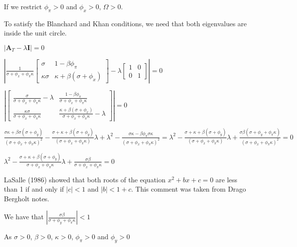\documentclass[
]{article}
\begin{document}
If we restrict \(\phi_\pi>0\) and \(\phi_x>0\), \(\Omega>0\).

To satisfy the Blanchard and Khan conditions, we need that both
eigenvalues are inside the unit circle.

\(|\mathbf{A}_T-\lambda \mathbf{I}| = 0\)

\(\displaystyle \left| \frac{1}{\sigma+\phi_x + \phi_\pi \kappa}\left[ \begin{matrix} \sigma & 1-\beta \phi_\pi\\ \kappa \sigma & \kappa+\beta (\sigma+\phi_x) \end{matrix} \right] -\lambda \left[ \begin{matrix} 1 & 0\\ 0 & 1 \end{matrix} \right] \right|=0\)

\(\displaystyle \left| \left[ \begin{matrix} \displaystyle \frac{\sigma}{\sigma+\phi_x + \phi_\pi \kappa}-\lambda & \displaystyle \frac{1-\beta \phi_\pi}{\sigma+\phi_x + \phi_\pi \kappa}\\ \displaystyle \frac{\kappa \sigma}{\sigma+\phi_x + \phi_\pi \kappa} & \displaystyle \frac{\kappa+\beta (\sigma+\phi_x)}{\sigma+\phi_x + \phi_\pi \kappa}-\lambda \end{matrix} \right] \right|=0\)

\(\displaystyle \frac{\sigma \kappa + \beta\sigma (\sigma+\phi_y)}{(\sigma+\phi_x + \phi_\pi \kappa)^2}- \frac{\sigma +\kappa + \beta (\sigma+ \phi_y)}{(\sigma+\phi_x + \phi_\pi \kappa)} \lambda + \lambda^2-\frac{\sigma \kappa-\beta \phi_\pi \sigma \kappa}{(\sigma+\phi_x + \phi_\pi \kappa)^2}=\lambda^2- \frac{\sigma +\kappa + \beta (\sigma+ \phi_y)}{(\sigma+\phi_x + \phi_\pi \kappa)} \lambda + \frac{\sigma \beta(\sigma+\phi_y+\phi_\pi \kappa)}{(\sigma+\phi_x + \phi_\pi \kappa)^2}=0\)

\(\displaystyle \lambda^2- \frac{\sigma +\kappa + \beta (\sigma+ \phi_y)}{\sigma+\phi_x + \phi_\pi \kappa} \lambda + \frac{\sigma \beta}{\sigma+\phi_x + \phi_\pi \kappa}=0\)

LaSalle (1986) showed that both roots of the equation \(x^2+bx+c=0\) are
less than 1 if and only if \(|c|<1\) and \(|b|<1+c\). This comment was
taken from Drago Bergholt notes.

We have that
\(\displaystyle \left| \frac{\sigma \beta}{\sigma+ \phi_y+\phi_\pi \kappa} \right|<1\)

As \(\sigma>0\), \(\beta>0\), \(\kappa>0\), \(\phi_\pi>0\) and
\(\phi_y>0\)
\end{document}
